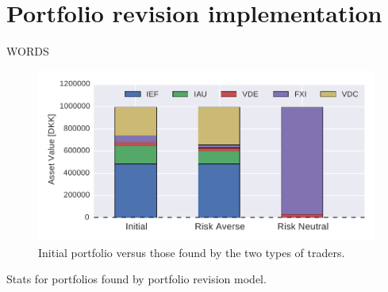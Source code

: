 \section{Portfolio revision implementation}

WORDS


\begin{figure}[tp]
\centering
\includegraphics{../pic/portfoliorevision_portfolio.pdf}
\caption{Initial portfolio versus those found by the two types of traders.}
\label{fig:prevpf}
\end{figure}

\begin{table}
\caption{Stats for portfolios found by portfolio revision model.}
\centering

\end{table}